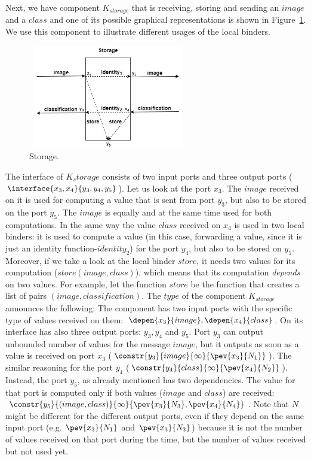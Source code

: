 Next, we have component $K_{storage}$ that is receiving, storing and sending an $image$ and a $class$ and one of its possible graphical representations is shown in Figure~\ref{storage1}. We use this component to illustrate different usages of the local binders. 

\begin{figure}[H]

\includegraphics[width=7cm,height=4.5cm]{storage1.jpg}
\centering
\caption{Storage.
\label{storage1}}

\end{figure}


The interface of $K_storage$ consists of two input ports and three output ports ($\interface{x_3,x_4}{y_3,y_4,y_5}$). Let us look at the port $x_3$. The $image$ received on it is used for computing a value that is sent from port $y_3$, but also to be stored on the port $y_5$. The $image$ is equally and at the same time used for both computations. In the same way the value $class$ received on $x_4$ is used in two local binders: it is used to compute a value (in this case, forwarding a value, since it is just an identity function-$identity_2$) for the port $y_4$, but also to be stored on $y_5$. Moreover, if we take a look at the local binder $store$, it needs two values for its computation ($store(image,class)$), which means that its computation \textit{depends} on two values. For example, let the function $store$ be the function that creates a list of pairs $(image,classification)$.  
The $type$ of the component $K_{storage}$ announces the following: The component has two input ports with the specific type of values received on them: $\depen{x_3}{image}, \depen{x_4}{class}$. On its interface has also three output ports: $y_3,y_4$ and $y_5$. Port $y_3$ can output unbounded number of values for the message $image$, but it outputs as soon as a value is received on port $x_3$ ($\constr{y_3}{image}{\infty}{\pev{x_3}{N_1}}$). The similar reasoning for the port $y_4$ ($\constr{y_4}{class}{\infty}{\pev{x_4}{N_2}}$). Instead, the port $y_5$, as already mentioned has two dependencies. The value for that port is computed only if both values ($image$ and $class$) are received: $\constr{y_5}{(image,class)}{\infty}{\pev{x_3}{N_3},\pev{x_4}{N_4}}$. Note that $N$ might be different for the different output ports, even if they depend on the same input port (e.g. $\pev{x_3}{N_1}$ and $\pev{x_3}{N_3}$) because it is not the number of values received on that port during the time, but the number of values received but not used yet.

